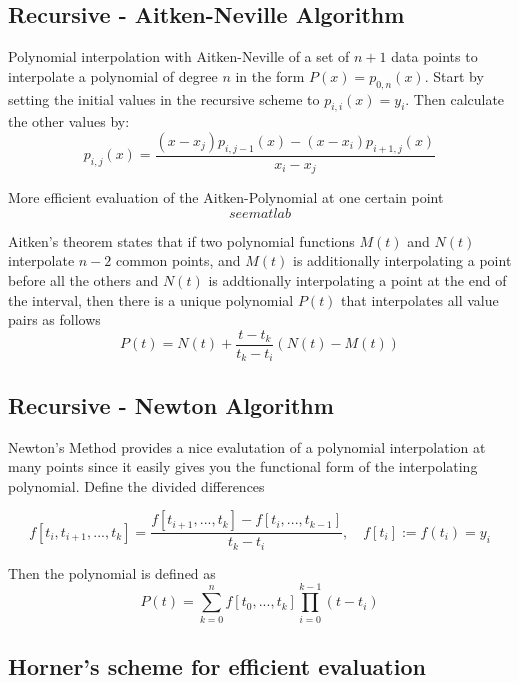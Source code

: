\documentclass[
    a4paper,
    11pt
]{article}
\begin{document}
\subsection{Recursive - Aitken-Neville Algorithm}

Polynomial interpolation with Aitken-Neville of a set of $n+1$ data points to
interpolate a polynomial of degree $n$ in the form $P(x) = p_{0,n}(x)$. Start by
setting the initial values in the recursive scheme to $p_{i,i}(x)=y_i$. Then
calculate the other values by:
\begin{equation}
    p_{i,j}(x) = \frac{(x-x_j)p_{i,j-1}(x) - (x-x_i)p_{i+1,j}(x)}{x_i - x_j}
\end{equation}

More efficient evaluation of the Aitken-Polynomial at one certain point
\begin{equation}
    see matlab
\end{equation}

Aitken's theorem states that if two polynomial functions $M(t)$ and $N(t)$
interpolate $n-2$ common points, and $M(t)$ is additionally interpolating a
point before all the others and $N(t)$ is addtionally interpolating a point at
the end of the interval, then there is a unique polynomial $P(t)$ that
interpolates all value pairs as follows
\begin{equation}
    P(t) = N(t) + \frac{t - t_k}{t_k - t_i} (N(t) - M(t))
\end{equation}

\subsection{Recursive - Newton Algorithm}

Newton's Method provides a nice evalutation of a polynomial interpolation at
many points since it easily gives you the functional form of the interpolating
polynomial. Define the divided differences

\begin{equation}
    f[t_i, t_{i+1}, ..., t_k] =
    \frac{f[t_{i+1}, ..., t_k] - f[t_i, ..., t_{k-1}]}{t_k - t_i},
    \quad
    f[t_i] := f(t_i) = y_i
\end{equation}

Then the polynomial is defined as
\begin{equation}
    P(t) = \sum_{k=0}^{n} f[t_0, ..., t_k] \prod_{i=0}^{k-1}(t - t_i)
\end{equation}

\subsection{Horner's scheme for efficient evaluation}
\end{document}
